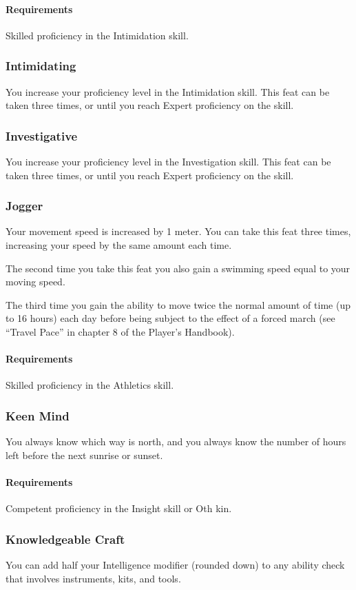     \paragraph{Requirements} Skilled proficiency in the Intimidation skill.
\subsubsection{Intimidating} \label{feat::intimidating}
    You increase your proficiency level in the Intimidation skill.
    This feat can be taken three times, or until you reach Expert proficiency on the skill.
\subsubsection{Investigative} \label{feat::investigative}
    You increase your proficiency level in the Investigation skill.
    This feat can be taken three times, or until you reach Expert proficiency on the skill.
\subsubsection{Jogger} \label{feat::jogger}
    Your movement speed is increased by 1 meter.
    You can take this feat three times, increasing your speed by the same amount each time.

    The second time you take this feat you also gain a swimming speed equal to your moving speed.

    The third time you gain the ability to move twice the normal amount of time (up to 16 hours) each day before being subject to the effect of a forced march (see ``Travel Pace'' in chapter 8 of the Player's Handbook).
    \paragraph{Requirements} Skilled proficiency in the Athletics skill.
\subsubsection{Keen Mind} \label{feat::keenmind}
    You always know which way is north, and you always know the number of hours left before the next sunrise or sunset.
    \paragraph{Requirements} Competent proficiency in the Insight skill or Oth kin.
\subsubsection{Knowledgeable Craft} \label{feat::knowledgeablecraft}
    You can add half your Intelligence modifier (rounded down) to any ability check that involves instruments, kits, and tools.
